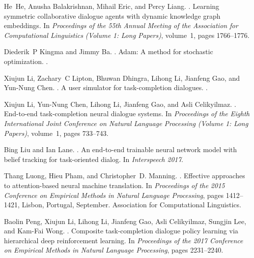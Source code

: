 \documentclass[11pt]{article}
\begin{document}
\begin{thebibliography}{}
	He~He, Anusha Balakrishnan, Mihail Eric, and Percy Liang.
	.
	\newblock Learning symmetric collaborative dialogue agents with dynamic
	knowledge graph embeddings.
	\newblock In {\em Proceedings of the 55th Annual Meeting of the Association for
		Computational Linguistics (Volume 1: Long Papers)}, volume~1, pages
	1766--1776.
	
	Diederik~P Kingma and Jimmy Ba.
	.
	\newblock Adam: A method for stochastic optimization.
	.
	
	Xiujun Li, Zachary~C Lipton, Bhuwan Dhingra, Lihong Li, Jianfeng Gao, and
	Yun-Nung Chen.
	.
	\newblock A user simulator for task-completion dialogues.
	.
	
	Xiujun Li, Yun-Nung Chen, Lihong Li, Jianfeng Gao, and Asli Celikyilmaz.
	.
	\newblock End-to-end task-completion neural dialogue systems.
	\newblock In {\em Proceedings of the Eighth International Joint Conference on
		Natural Language Processing (Volume 1: Long Papers)}, volume~1, pages
	733--743.
	
	Bing Liu and Ian Lane.
	.
	\newblock An end-to-end trainable neural network model with belief tracking for
	task-oriented dialog.
	\newblock In {\em Interspeech 2017}.
	
	Thang Luong, Hieu Pham, and Christopher~D. Manning.
	.
	\newblock Effective approaches to attention-based neural machine translation.
	\newblock In {\em Proceedings of the 2015 Conference on Empirical Methods in
		Natural Language Processing}, pages 1412--1421, Lisbon, Portugal, September.
	Association for Computational Linguistics.
	
	Baolin Peng, Xiujun Li, Lihong Li, Jianfeng Gao, Asli Celikyilmaz, Sungjin Lee,
	and Kam-Fai Wong.
	.
	\newblock Composite task-completion dialogue policy learning via hierarchical
	deep reinforcement learning.
	\newblock In {\em Proceedings of the 2017 Conference on Empirical Methods in
		Natural Language Processing}, pages 2231--2240.
	

\end{thebibliography}
\end{document}
